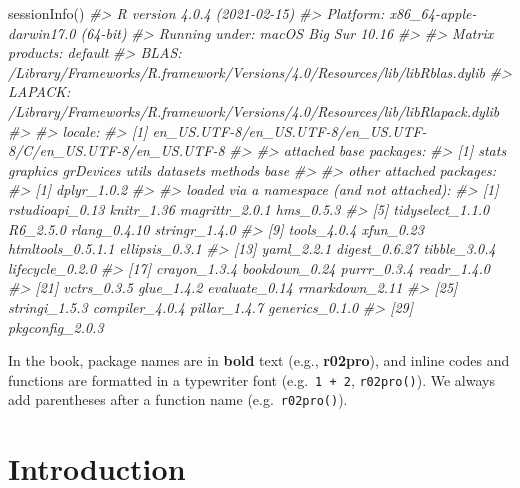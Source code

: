 \documentclass[
]{book}
\newenvironment{Shaded}{\begin{snugshade}}{\end{snugshade}}
\newcommand{\CommentTok}[1]{\textcolor[rgb]{0.56,0.35,0.01}{\textit{#1}}}
\newcommand{\FunctionTok}[1]{\textcolor[rgb]{0.00,0.00,0.00}{#1}}
\newcommand{\NormalTok}[1]{#1}
\begin{document}
\begin{Shaded}
\begin{Highlighting}[]
\FunctionTok{sessionInfo}\NormalTok{()}
\CommentTok{\#\textgreater{} R version 4.0.4 (2021{-}02{-}15)}
\CommentTok{\#\textgreater{} Platform: x86\_64{-}apple{-}darwin17.0 (64{-}bit)}
\CommentTok{\#\textgreater{} Running under: macOS Big Sur 10.16}
\CommentTok{\#\textgreater{} }
\CommentTok{\#\textgreater{} Matrix products: default}
\CommentTok{\#\textgreater{} BLAS:   /Library/Frameworks/R.framework/Versions/4.0/Resources/lib/libRblas.dylib}
\CommentTok{\#\textgreater{} LAPACK: /Library/Frameworks/R.framework/Versions/4.0/Resources/lib/libRlapack.dylib}
\CommentTok{\#\textgreater{} }
\CommentTok{\#\textgreater{} locale:}
\CommentTok{\#\textgreater{} [1] en\_US.UTF{-}8/en\_US.UTF{-}8/en\_US.UTF{-}8/C/en\_US.UTF{-}8/en\_US.UTF{-}8}
\CommentTok{\#\textgreater{} }
\CommentTok{\#\textgreater{} attached base packages:}
\CommentTok{\#\textgreater{} [1] stats     graphics  grDevices utils     datasets  methods   base     }
\CommentTok{\#\textgreater{} }
\CommentTok{\#\textgreater{} other attached packages:}
\CommentTok{\#\textgreater{} [1] dplyr\_1.0.2}
\CommentTok{\#\textgreater{} }
\CommentTok{\#\textgreater{} loaded via a namespace (and not attached):}
\CommentTok{\#\textgreater{}  [1] rstudioapi\_0.13   knitr\_1.36        magrittr\_2.0.1    hms\_0.5.3        }
\CommentTok{\#\textgreater{}  [5] tidyselect\_1.1.0  R6\_2.5.0          rlang\_0.4.10      stringr\_1.4.0    }
\CommentTok{\#\textgreater{}  [9] tools\_4.0.4       xfun\_0.23         htmltools\_0.5.1.1 ellipsis\_0.3.1   }
\CommentTok{\#\textgreater{} [13] yaml\_2.2.1        digest\_0.6.27     tibble\_3.0.4      lifecycle\_0.2.0  }
\CommentTok{\#\textgreater{} [17] crayon\_1.3.4      bookdown\_0.24     purrr\_0.3.4       readr\_1.4.0      }
\CommentTok{\#\textgreater{} [21] vctrs\_0.3.5       glue\_1.4.2        evaluate\_0.14     rmarkdown\_2.11   }
\CommentTok{\#\textgreater{} [25] stringi\_1.5.3     compiler\_4.0.4    pillar\_1.4.7      generics\_0.1.0   }
\CommentTok{\#\textgreater{} [29] pkgconfig\_2.0.3}
\end{Highlighting}
\end{Shaded}

In the book, package names are in \textbf{bold} text (e.g., \textbf{r02pro}), and inline codes and functions are formatted in a typewriter font (e.g.~\texttt{1\ +\ 2}, \texttt{r02pro()}). We always add parentheses after a function name (e.g.~\texttt{r02pro()}).

\hypertarget{introduction}{%
\chapter{Introduction}\label{introduction}}
\end{document}
